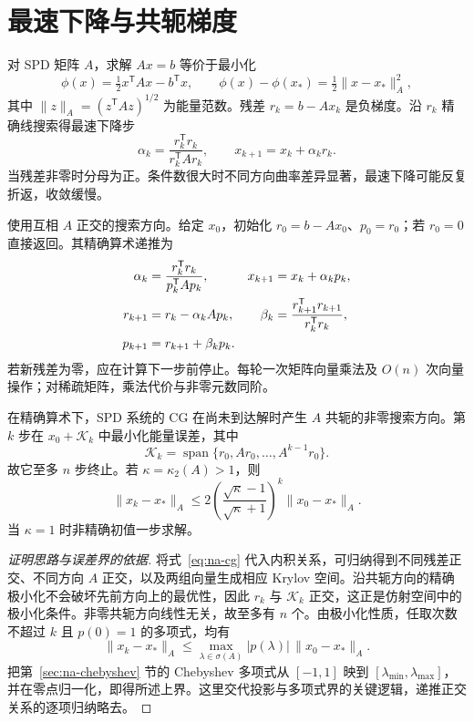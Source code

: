 \documentclass[UTF8,12pt,a4paper,fontset=fandol]{ctexbook}
\begin{document}
\section{最速下降与共轭梯度}
对 SPD 矩阵 $A$，求解 $Ax=b$ 等价于最小化
\[
 \phi(x)=\tfrac12x^{\mathsf T}Ax-b^{\mathsf T}x,
 \qquad \phi(x)-\phi(x_*)=\tfrac12\|x-x_*\|_A^2,
\]
其中 $\|z\|_A=(z^{\mathsf T}Az)^{1/2}$ 为能量范数。残差 $r_k=b-Ax_k$ 是负梯度。沿 $r_k$ 精确线搜索得最速下降步
\[
 \alpha_k=\frac{r_k^{\mathsf T}r_k}{r_k^{\mathsf T}Ar_k},\qquad
 x_{k+1}=x_k+\alpha_kr_k.
\]
当残差非零时分母为正。条件数很大时不同方向曲率差异显著，最速下降可能反复折返，收敛缓慢。

使用互相 $A$ 正交的搜索方向。给定 $x_0$，初始化 $r_0=b-Ax_0$、$p_0=r_0$；若 $r_0=0$ 直接返回。其精确算术递推为
\begin{align}
 \alpha_k&=\frac{r_k^{\mathsf T}r_k}{p_k^{\mathsf T}Ap_k},&
 x_{k+1}&=x_k+\alpha_kp_k,\notag\\
 r_{k+1}&=r_k-\alpha_kAp_k,&
 \beta_k&=\frac{r_{k+1}^{\mathsf T}r_{k+1}}{r_k^{\mathsf T}r_k},\notag\\
 p_{k+1}&=r_{k+1}+\beta_kp_k.
 \label{eq:na-cg}
\end{align}
若新残差为零，应在计算下一步前停止。每轮一次矩阵向量乘法及 $O(n)$ 次向量操作；对稀疏矩阵，乘法代价与非零元数同阶。

\begin{theorem}[CG 的投影性质与误差界]
\label{thm:na-cg}
在精确算术下，SPD 系统的 CG 在尚未到达解时产生 $A$ 共轭的非零搜索方向。第 $k$ 步在 $x_0+\mathcal K_k$ 中最小化能量误差，其中
\[
 \mathcal K_k=\operatorname{span}\{r_0,Ar_0,\ldots,A^{k-1}r_0\}.
\]
故它至多 $n$ 步终止。若 $\kappa=\kappa_2(A)>1$，则
\[
 \|x_k-x_*\|_A\le
 2\left(\frac{\sqrt\kappa-1}{\sqrt\kappa+1}\right)^k\|x_0-x_*\|_A.
\]
当 $\kappa=1$ 时非精确初值一步求解。
\end{theorem}
\begin{proof}[证明思路与误差界的依据]
将式~\eqref{eq:na-cg} 代入内积关系，可归纳得到不同残差正交、不同方向 $A$ 正交，以及两组向量生成相应 Krylov 空间。沿共轭方向的精确极小化不会破坏先前方向上的最优性，因此 $r_k$ 与 $\mathcal K_k$ 正交，这正是仿射空间中的极小化条件。非零共轭方向线性无关，故至多有 $n$ 个。由极小化性质，任取次数不超过 $k$ 且 $p(0)=1$ 的多项式，均有
\[
 \|x_k-x_*\|_A\le\max_{\lambda\in\sigma(A)}|p(\lambda)|\,\|x_0-x_*\|_A.
\]
把第~\ref{sec:na-chebyshev} 节的 Chebyshev 多项式从 $[-1,1]$ 映到 $[\lambda_{\min},\lambda_{\max}]$，并在零点归一化，即得所述上界。这里交代投影与多项式界的关键逻辑，递推正交关系的逐项归纳略去。
\end{proof}
\end{document}

